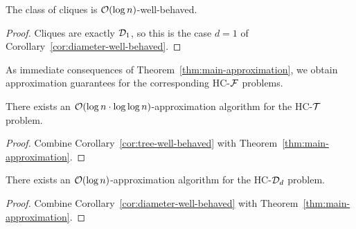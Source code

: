     \begin{corollary}\label{cor:clique-well-behaved}
        The class of cliques is $\mathcal{O}\mathopen{}\left( \log n \right)$-well-behaved.
    \end{corollary}
    \begin{proof}
        Cliques are exactly $\mathcal{D}_1$, so this is the case $d=1$ of Corollary~\ref{cor:diameter-well-behaved}.
    \end{proof}

    As immediate consequences of Theorem~\ref{thm:main-approximation}, we obtain approximation guarantees for the corresponding \textsc{HC-$\mathcal{F}$} problems.

    \begin{corollary}
        There exists an $\mathcal{O}\mathopen{}\left( \log n \cdot \log\log n \right)$-approximation algorithm for the \textsc{HC-$\mathcal{T}$} problem.
    \end{corollary}
    \begin{proof}
        Combine Corollary~\ref{cor:tree-well-behaved} with Theorem~\ref{thm:main-approximation}.
    \end{proof}

    \begin{corollary}
        There exists an $\mathcal{O}\mathopen{}\left( \log n \right)$-approximation algorithm for the \textsc{HC-$\mathcal{D}_d$} problem.
    \end{corollary}
    \begin{proof}
        Combine Corollary~\ref{cor:diameter-well-behaved} with Theorem~\ref{thm:main-approximation}.
    \end{proof}
